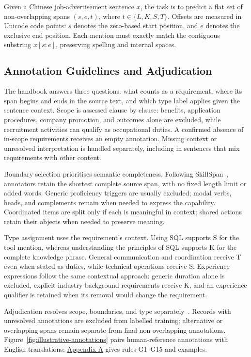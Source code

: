 Given a Chinese job-advertisement sentence $x$, the task is to predict a flat set of non-overlapping spans $(s,e,t)$, where $t\in\{L,K,S,T\}$. Offsets are measured in Unicode code points: $s$ denotes the zero-based start position, and $e$ denotes the exclusive end position. Each mention must exactly match the contiguous substring $x[s:e]$, preserving spelling and internal spaces.





\subsection{Annotation Guidelines and Adjudication}
\label{sec:annotation-guidelines-r36}

The handbook answers three questions: what counts as a requirement, where its span begins and ends in the source text, and which type label applies given the sentence context. Scope is assessed clause by clause: benefits, application procedures, company promotion, and outcomes alone are excluded, while recruitment activities can qualify as occupational duties. A confirmed absence of in-scope requirements receives an empty annotation. Missing context or unresolved interpretation is handled separately, including in sentences that mix requirements with other content.

Boundary selection prioritises semantic completeness. Following SkillSpan~\citep{zhang2022skillspan}, annotators retain the shortest complete source span, with no fixed length limit or added words. Generic proficiency triggers are usually excluded; modal verbs, heads, and complements remain when needed to express the capability. Coordinated items are split only if each is meaningful in context; shared actions retain their objects when needed to preserve meaning.

Type assignment uses the requirement's context. Using SQL supports S for the tool mention, whereas understanding the principles of SQL supports K for the complete knowledge phrase. General communication and coordination receive T even when stated as duties, while technical operations receive S. Experience expressions follow the same contextual approach: generic duration alone is excluded, explicit industry-background requirements receive K, and an experience qualifier is retained when its removal would change the requirement.

Adjudication resolves scope, boundaries, and type separately~\citep{artstein2008agreement}. Records with unresolved annotations are excluded from labelled training; alternative or overlapping spans remain separate from final non-overlapping annotations. Figure~\ref{fig:illustrative-annotations} pairs human-reference annotations with English translations; \hyperref[app:a]{Appendix A} gives rules G1--G15 and examples.

